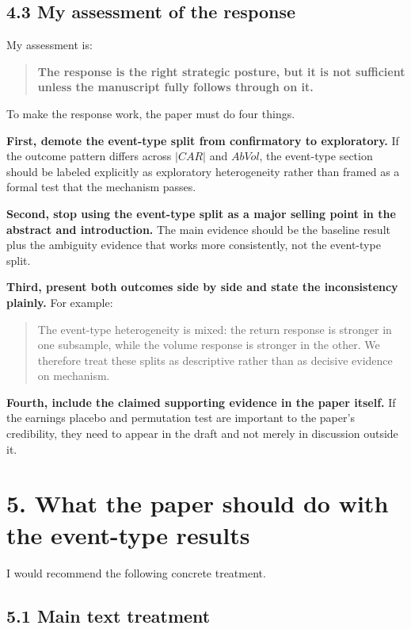 \documentclass[11pt]{article}
\begin{document}
\subsection*{4.3 My assessment of the response}

My assessment is:

\begin{quote}
\textbf{The response is the right strategic posture, but it is not sufficient unless the manuscript fully follows through on it.}
\end{quote}

To make the response work, the paper must do four things.

\textbf{First, demote the event-type split from confirmatory to exploratory.} If the outcome pattern differs across $|CAR|$ and $AbVol$, the event-type section should be labeled explicitly as exploratory heterogeneity rather than framed as a formal test that the mechanism passes.

\textbf{Second, stop using the event-type split as a major selling point in the abstract and introduction.} The main evidence should be the baseline result plus the ambiguity evidence that works more consistently, not the event-type split.

\textbf{Third, present both outcomes side by side and state the inconsistency plainly.} For example:
\begin{quote}
The event-type heterogeneity is mixed: the return response is stronger in one subsample, while the volume response is stronger in the other. We therefore treat these splits as descriptive rather than as decisive evidence on mechanism.
\end{quote}

\textbf{Fourth, include the claimed supporting evidence in the paper itself.} If the earnings placebo and permutation test are important to the paper's credibility, they need to appear in the draft and not merely in discussion outside it.

\section*{5. What the paper should do with the event-type results}

I would recommend the following concrete treatment.

\subsection*{5.1 Main text treatment}
\end{document}
